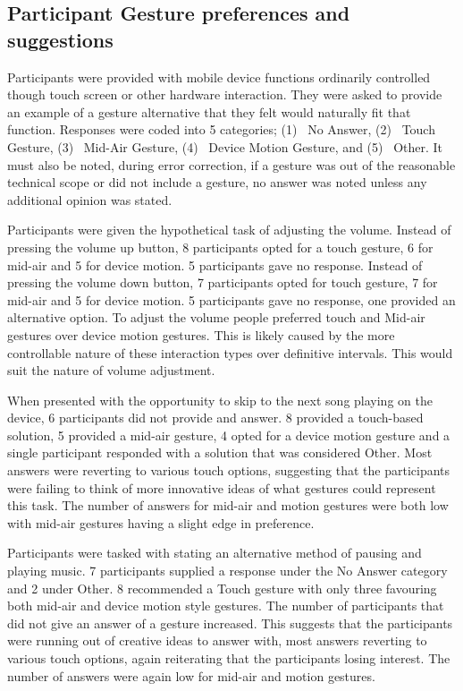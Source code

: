 \documentclass{l4proj}
\begin{document}
\subsection{Participant Gesture preferences and suggestions}

Participants were provided with mobile device functions ordinarily controlled though touch screen or other hardware interaction. They were asked to provide an example of a gesture alternative that they felt would naturally fit that function. Responses were coded into 5 categories; (1)~ No Answer, (2)~ Touch Gesture, (3)~ Mid-Air Gesture, (4)~ Device Motion Gesture, and (5)~ Other. It must also be noted, during error correction, if a gesture was out of the reasonable technical scope or did not include a gesture, no answer was noted unless any additional opinion was stated.

Participants were given the hypothetical task of adjusting the volume. Instead of pressing the volume up button, 8 participants opted for a touch gesture, 6 for mid-air and 5 for device motion. 5 participants gave no response. Instead of pressing the volume down button, 7 participants opted for touch gesture, 7 for mid-air and 5 for device motion. 5 participants gave no response, one provided an alternative option. To adjust the volume people preferred touch and Mid-air gestures over device motion gestures. This is likely caused by the more controllable nature of these interaction types over definitive intervals. This would suit the nature of volume adjustment.

When presented with the opportunity to skip to the next song playing on the device, 6 participants did not provide and answer. 8 provided a touch-based solution, 5 provided a mid-air gesture, 4 opted for a device motion gesture and a single participant responded with a solution that was considered Other. Most answers were reverting to various touch options, suggesting that the participants were failing to think of more innovative ideas of what gestures could represent this task. The number of answers for mid-air and motion gestures were both low with mid-air gestures having a slight edge in preference.

Participants were tasked with stating an alternative method of pausing and playing music. 7 participants supplied a response under the No Answer category and 2 under Other. 8 recommended a Touch gesture with only three favouring both mid-air and device motion style gestures. The number of participants that did not give an answer of a gesture increased. This suggests that the participants were running out of creative ideas to answer with, most answers reverting to various touch options, again reiterating that the participants losing interest. The number of answers were again low for mid-air and motion gestures.
\end{document}
